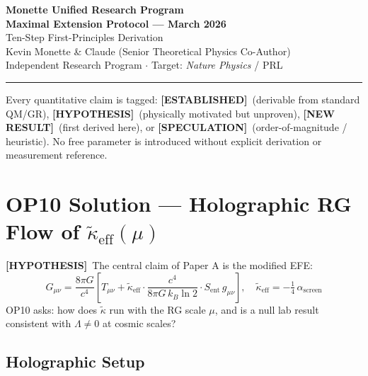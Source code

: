 \documentclass[11pt,letterpaper]{article}
\newcommand{\EST}{\textcolor{established}{\textbf{[ESTABLISHED]}}}
\newcommand{\HYP}{\textcolor{hypothesis}{\textbf{[HYPOTHESIS]}}}
\newcommand{\NEW}{\textcolor{newresult}{\textbf{[NEW RESULT]}}}
\newcommand{\SPEC}{\textcolor{speculation}{\textbf{[SPECULATION]}}}
\newcommand{\asc}{\alpha_{\mathrm{screen}}}
\newcommand{\keff}{\tilde{\kappa}_{\mathrm{eff}}}
\begin{document}
\begin{center}
  {\LARGE\bfseries\color{headblue} Monette Unified Research Program}\\[6pt]
  {\large\bfseries Maximal Extension Protocol --- March 2026}\\[4pt]
  {\normalsize Ten-Step First-Principles Derivation}\\[6pt]
  {\normalsize Kevin Monette \& Claude (Senior Theoretical Physics Co-Author)}\\[2pt]
  {\small Independent Research Program $\cdot$ Target: \textit{Nature Physics} / PRL}
\end{center}

\vspace{4pt}\hrule\vspace{6pt}

\begin{warnbox}
Every quantitative claim is tagged:
\EST\ (derivable from standard QM/GR),
\HYP\ (physically motivated but unproven),
\NEW\ (first derived here), or
\SPEC\ (order-of-magnitude / heuristic).
No free parameter is introduced without explicit derivation or measurement reference.
\end{warnbox}

\tableofcontents
\newpage

\section{OP10 Solution --- Holographic RG Flow of $\keff(\mu)$}

\HYP\ The central claim of Paper A is the modified EFE:
\begin{equation}
  G_{\mu\nu} = \frac{8\pi G}{c^4}\left[T_{\mu\nu} + \keff \cdot \frac{c^4}{8\pi G\, k_B \ln 2} \cdot S_{\mathrm{ent}}\, g_{\mu\nu}\right], \quad \keff = -\tfrac{1}{4}\,\asc
  \label{eq:EFE}
\end{equation}
OP10 asks: how does $\tilde{\kappa}$ run with the RG scale $\mu$, and is a null lab result consistent with $\Lambda \neq 0$ at cosmic scales?

\subsection{Holographic Setup}
\end{document}
